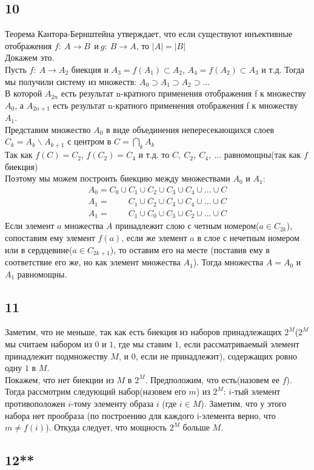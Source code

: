 		\subsection{10}
		Теорема Кантора-Бернштейна утверждает, что если существуют инъективные отображения $f: \: A \to B \: \ \text{и} \ g: \: B \to A$, то $|A| = |B|$\\ 
		Докажем это.\\
		Пусть $f: \: A \to A_2$ биекция и $A_3 = f(A_1) \subset A_2$, $A_4 = f(A_2) \subset A_3$ и т.д. Тогда мы получили систему из множеств: $A_0 \supset A_1 \supset A_2 \supset ... $\\
		В которой $A_{2n}$ есть результат n-кратного применения отображения f к множеству $A_0$, а
		$A_{2n+1}$ есть результат n-кратного применения отображения f к множеству $A_1$.\\
		Представим множество $A_0$ в виде объединения непересекающихся слоев $C_k = A_k \backslash A_{k+1}$ с центром в $C = \bigcap\limits_{k} A_k$\\
		Так как $f(C) = C_{2}$, $f(C_2) = C_{4}$ и т.д. то $C,\: C_2,\: C_4,\: ...$ равномощны(так как $f$ биекция)\\
		Поэтому мы можем построить биекцию между множествами $A_0$ и $A_1$:\\
		\begin{gather*}
		A_0 = C_0 \cup C_1 \cup C_2 \cup C_3 \cup C_4 \cup ... \cup C\\
		A_1 = \: \qquad C_1 \cup C_2 \cup C_3 \cup C_4 \cup ... \cup C\\
		A_1 = \: \qquad C_1 \cup C_0 \cup C_3 \cup C_2 \cup ... \cup C
		\end{gather*}
		Если элемент $a$ множества $A$ принадлежит слою с четным номером($a \in C_{2k}$), сопоставим ему элемент $f(a)$, если же элемент $a$ в слое с нечетным номером или в сердцевине($a \in C_{2k+1}$), то оставим его на месте (поставив ему в соответствие его же, но как элемент множества $A_1$). Тогда множества $A = A_0$ и $A_1$ равномощны.
		
		\subsection{11}
		
		Заметим, что не меньше, так как есть биекция из наборов принадлежащих $2^M$($2^M$  мы считаем набором из $0$ и $1$, где мы ставим $1$, если рассматриваемый элемент принадлежит подмножеству $M$, и $0$, если не принадлежит), содержащих ровно одну $1$ в $M$.\\
		Покажем, что нет биекции из $M$ в $2^M$. Предположим, что есть(назовем ее $f$). Тогда рассмотрим следующий набор(назовем его $m$) из $2^M$: $i$-тый элемент противоположен $i$-тому элементу образа $i$ (где $i \in M$). Заметим, что у этого набора нет прообраза (по построению для каждого i-элемента верно, что $m \ne f(i)$).
		Откуда следует, что мощность $2^M$ больше $M$.
		\subsection{12**}